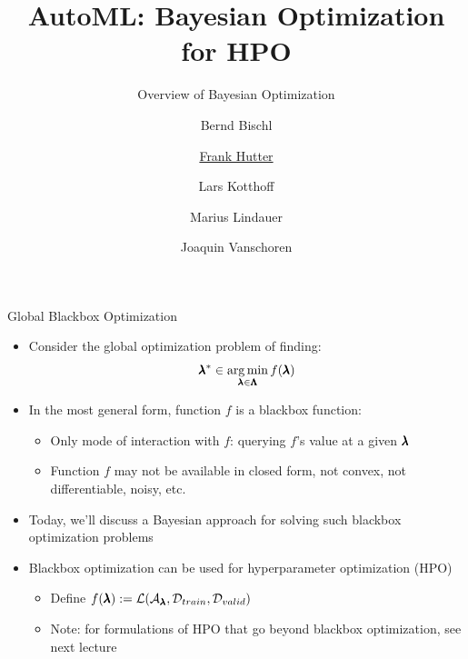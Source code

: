 


\title{AutoML: Bayesian Optimization for HPO}
\subtitle{Overview of Bayesian Optimization}
\author[Marius Lindauer]{Bernd Bischl \and \underline{Frank Hutter} \and Lars Kotthoff\newline \and Marius Lindauer \and Joaquin Vanschoren}
\institute{}
\date{}
    
    
    

\maketitle
   
\begin{frame}[c]{Global Blackbox Optimization}
    
    \begin{itemize}
        \item Consider the \alert{global optimization problem} of finding: 
        \[\pmb{\lambda}^* \in \operatorname*{arg\,min}_{\pmb{\lambda} \in \pmb{\Lambda}} f(\pmb{\lambda})\]
        
\pause
        \item In the most general form, function $f$ is a \alert{blackbox function}:
    	
    	\begin{center}
\scalebox{0.5}{}
    	\end{center}

    
   \begin{itemize}
    	\item Only mode of interaction with $f$: querying $f$'s value at a given $\pmb{\lambda}$ 
        \item Function $f$ may not be available in closed form, not convex, not differentiable, noisy, etc. 
   \end{itemize}
\medskip
\pause

        \item Today, we'll discuss a \alert{Bayesian} approach for solving such blackbox optimization problems
\medskip
\pause
        \item Blackbox optimization can be used for hyperparameter optimization (HPO)
   	 	\begin{itemize}
         	\item Define \alert{$f(\pmb{\lambda}) := \mathcal{L}( \mathcal{A}_{\pmb{\lambda}}, \mathcal{D}_{train}, \mathcal{D}_{valid} )$}
        	\item Note: for formulations of HPO that go beyond blackbox optimization, see next lecture
        \end{itemize}
    \end{itemize}    
\end{frame}

